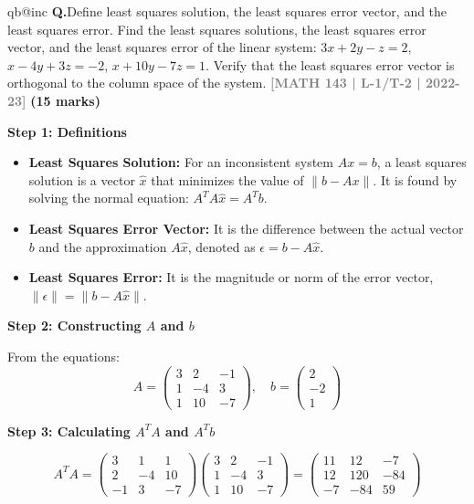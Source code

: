 \documentclass[12pt,a3paper]{article}
\makeatletter
\newcommand{\yr}[1]{\hfill\textcolor{gray}{\small\textbf{[#1]}}}
\newcommand{\mk}[1]{\textcolor{orange!70!black}{\small\textbf{(#1 marks)}}}
\newcounter{qnum}
\newcommand{\Q}[1]{%
  \csname qb@inc\endcsname
  \needspace{4\baselineskip}
  \refstepcounter{qnum}
  \vspace{6pt}
  \noindent\textbf{Q\theqnum.}\enspace #1\par
}
\makeatother
\begin{document}
\Q{Define least squares solution, the least squares error vector, and the least squares error. Find the least squares solutions, the least squares error vector, and the least squares error of the linear system:
$3x + 2y - z = 2$, \quad $x - 4y + 3z = -2$, \quad $x + 10y - 7z = 1$.
Verify that the least squares error vector is orthogonal to the column space of the system.
\yr{MATH 143 | L-1/T-2 | 2022-23} \mk{15}}
\begin{tcolorbox}[enhanced,breakable,
  colback=cB!4,colframe=cB,boxrule=0.8pt,arc=5pt,
  title={\textbf{Answer --- Least Squares Analysis}},
  fonttitle=\bfseries\color{white},colbacktitle=cB]

\textbf{Step 1: Definitions}

\begin{itemize}
    \item \textbf{Least Squares Solution:} For an inconsistent system $Ax = b$, a least squares solution is a vector $\hat{x}$ that minimizes the value of $\|b - Ax\|$. It is found by solving the normal equation: $A^T A \hat{x} = A^T b$.
    \item \textbf{Least Squares Error Vector:} It is the difference between the actual vector $b$ and the approximation $A\hat{x}$, denoted as $\epsilon = b - A\hat{x}$.
    \item \textbf{Least Squares Error:} It is the magnitude or norm of the error vector, $\|\epsilon\| = \|b - A\hat{x}\|$.
\end{itemize}

\medskip
\textbf{Step 2: Constructing $A$ and $b$}

From the equations:
$$A = \begin{pmatrix} 3 & 2 & -1 \\ 1 & -4 & 3 \\ 1 & 10 & -7 \end{pmatrix}, \quad b = \begin{pmatrix} 2 \\ -2 \\ 1 \end{pmatrix}$$

\medskip
\textbf{Step 3: Calculating $A^T A$ and $A^T b$}

$$A^T A = \begin{pmatrix} 3 & 1 & 1 \\ 2 & -4 & 10 \\ -1 & 3 & -7 \end{pmatrix} \begin{pmatrix} 3 & 2 & -1 \\ 1 & -4 & 3 \\ 1 & 10 & -7 \end{pmatrix} = \begin{pmatrix} 11 & 12 & -7 \\ 12 & 120 & -84 \\ -7 & -84 & 59 \end{pmatrix}$$


\end{tcolorbox}
\end{document}
